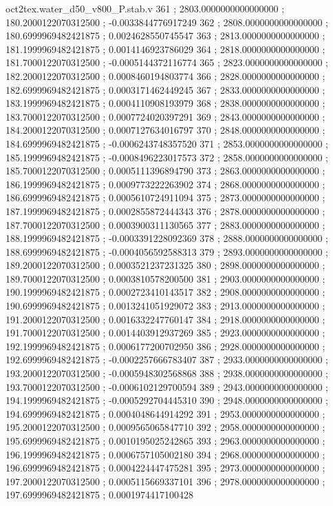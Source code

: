 \begin{filecontents}[overwrite]{oct2tex.water_d50_v800_P.stab.v}
361 ; 2803.0000000000000000 ; 180.2000122070312500 ; -0.0033844776917249
362 ; 2808.0000000000000000 ; 180.6999969482421875 ; 0.0024628550745547
363 ; 2813.0000000000000000 ; 181.1999969482421875 ; 0.0014146923786029
364 ; 2818.0000000000000000 ; 181.7000122070312500 ; -0.0005144372116774
365 ; 2823.0000000000000000 ; 182.2000122070312500 ; 0.0008460194803774
366 ; 2828.0000000000000000 ; 182.6999969482421875 ; 0.0003171462449245
367 ; 2833.0000000000000000 ; 183.1999969482421875 ; 0.0004110908193979
368 ; 2838.0000000000000000 ; 183.7000122070312500 ; 0.0007724020397291
369 ; 2843.0000000000000000 ; 184.2000122070312500 ; 0.0007127634016797
370 ; 2848.0000000000000000 ; 184.6999969482421875 ; -0.0006243748357520
371 ; 2853.0000000000000000 ; 185.1999969482421875 ; -0.0008496223017573
372 ; 2858.0000000000000000 ; 185.7000122070312500 ; 0.0005111396894790
373 ; 2863.0000000000000000 ; 186.1999969482421875 ; 0.0009773222263902
374 ; 2868.0000000000000000 ; 186.6999969482421875 ; 0.0005610724911094
375 ; 2873.0000000000000000 ; 187.1999969482421875 ; 0.0002855872444343
376 ; 2878.0000000000000000 ; 187.7000122070312500 ; 0.0003900311130565
377 ; 2883.0000000000000000 ; 188.1999969482421875 ; -0.0003391228092369
378 ; 2888.0000000000000000 ; 188.6999969482421875 ; -0.0004056592588313
379 ; 2893.0000000000000000 ; 189.2000122070312500 ; 0.0003521237231325
380 ; 2898.0000000000000000 ; 189.7000122070312500 ; 0.0003810578200500
381 ; 2903.0000000000000000 ; 190.1999969482421875 ; 0.0002723410143517
382 ; 2908.0000000000000000 ; 190.6999969482421875 ; 0.0013241051929072
383 ; 2913.0000000000000000 ; 191.2000122070312500 ; 0.0016332247760147
384 ; 2918.0000000000000000 ; 191.7000122070312500 ; 0.0014403912937269
385 ; 2923.0000000000000000 ; 192.1999969482421875 ; 0.0006177200702950
386 ; 2928.0000000000000000 ; 192.6999969482421875 ; -0.0002257666783407
387 ; 2933.0000000000000000 ; 193.2000122070312500 ; -0.0005948302568868
388 ; 2938.0000000000000000 ; 193.7000122070312500 ; -0.0006102129700594
389 ; 2943.0000000000000000 ; 194.1999969482421875 ; -0.0005292704445310
390 ; 2948.0000000000000000 ; 194.6999969482421875 ; 0.0004048644914292
391 ; 2953.0000000000000000 ; 195.2000122070312500 ; 0.0009565065847710
392 ; 2958.0000000000000000 ; 195.6999969482421875 ; 0.0010195025242865
393 ; 2963.0000000000000000 ; 196.1999969482421875 ; 0.0006757105002180
394 ; 2968.0000000000000000 ; 196.6999969482421875 ; 0.0004224447475281
395 ; 2973.0000000000000000 ; 197.2000122070312500 ; 0.0005115669337101
396 ; 2978.0000000000000000 ; 197.6999969482421875 ; 0.0001974417100428

\end{filecontents}
